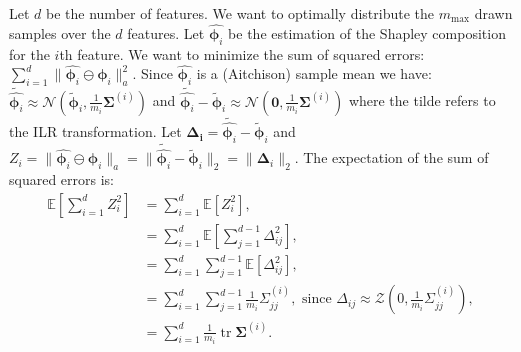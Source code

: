 \documentclass{article}
\theoremstyle{plain}
\theoremstyle{definition}
\theoremstyle{remark}
\DeclareMathOperator{\tr}{tr}
\begin{document}
Let $d$ be the number of features. We want to optimally distribute the $m_{\text{max}}$ drawn samples over the $d$ features. Let $\hat{\bm{\phi}_i}$ be the estimation of the Shapley composition for the $i$th feature. We want to minimize the sum of squared errors: $\displaystyle\sum_{i=1}^{d} \| \hat{\bm{\phi}_i} \ominus \bm{\phi}_i \|_a^2$. Since $\hat{\bm{\phi}_i}$ is a (Aitchison) sample mean we have: $\tilde{\hat{\bm{\phi}_i}} \approx \mathcal{N}(\tilde{\bm{\phi}}_i, \frac{1}{m_i}\bm{\Sigma}^{(i)})$ and $\tilde{\hat{\bm{\phi}_i}} - \tilde{\bm{\phi}}_i \approx \mathcal{N}(\bm{0}, \frac{1}{m_i}\bm{\Sigma}^{(i)})$ where the tilde refers to the ILR transformation.
Let $\bm{\Delta_i} = \tilde{\hat{\bm{\phi}_i}} - \tilde{\bm{\phi}}_i$ and $Z_i = \| \hat{\bm{\phi}_i} \ominus \bm{\phi}_i \|_a = \| \tilde{\hat{\bm{\phi}_i}} - \tilde{\bm{\phi}}_i \|_2 = \| \bm{\Delta}_i \|_2$. The expectation of the sum of squared errors is:
\begin{equation}
  \begin{aligned}
    \mathbb{E}\left[ \sum_{i=1}^{d} Z_i^2 \right] &=   \sum_{i=1}^{d} \mathbb{E}\left[ Z_i^2 \right],\\
                                                  & =\sum_{i=1}^{d} \mathbb{E}\left[ \sum_{j=1}^{d-1}\Delta_{ij}^2 \right],\\
                                                  & =\sum_{i=1}^{d} \sum_{j=1}^{d-1} \mathbb{E}\left[\Delta_{ij}^2 \right],\\
                                                  & =\sum_{i=1}^{d} \sum_{j=1}^{d-1} \frac{1}{m_i}\Sigma_{jj}^{(i)}, \text{ since } \Delta_{ij}\approx \mathcal{Z}(0, \frac{1}{m_i}\Sigma_{jj}^{(i)}),\\
    &= \sum_{i=1}^d \frac{1}{m_i} \tr \bm{\Sigma}^{(i)}.
  \end{aligned}
\end{equation}
\end{document}
